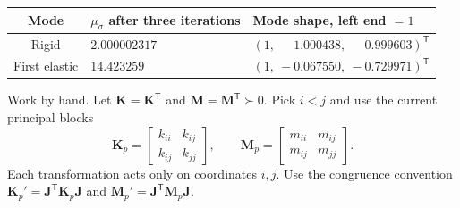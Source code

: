\documentclass[12pt]{article}
\newcommand{\T}{^{\mathsf T}}
\newcommand{\vct}[1]{\mathbf{#1}}
\newcommand{\colv}[1]{\begin{bmatrix}#1\end{bmatrix}}
\begin{document}
\begin{center}
  \begin{tabular}{@{}cll@{}}
    \toprule
    Mode          & $\mu_\sigma$ after three iterations & Mode shape, left end $=1$                           \\
    \midrule
    Rigid         & $2.000002317$                       & $(1,\ \phantom{-}1.000438,\ \phantom{-}0.999603)\T$ \\
    First elastic & $14.423259$                         & $(1,\ -0.067550,\ -0.729971)\T$                     \\
    \bottomrule
  \end{tabular}
\end{center}
\newpage
{}
Work by hand. Let $\vct K=\vct K\T$ and $\vct M=\vct M\T\succ0$. Pick
$i<j$ and use the current principal blocks
\[
  \vct K_p=\colv{k_{ii}&k_{ij}\\k_{ij}&k_{jj}},\qquad
  \vct M_p=\colv{m_{ii}&m_{ij}\\m_{ij}&m_{jj}} .
\]
Each transformation acts only on coordinates $i,j$. Use the congruence
convention $\vct K_p'=\vct J\T\vct K_p\vct J$ and
$\vct M_p'=\vct J\T\vct M_p\vct J$.
\end{document}
